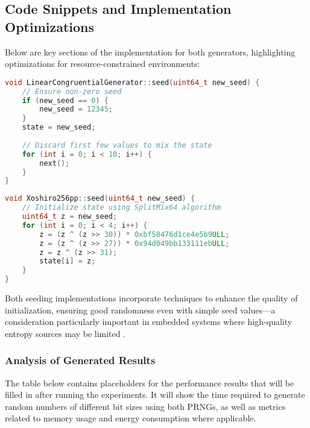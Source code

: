 \subsection{Code Snippets and Implementation Optimizations}

Below are key sections of the implementation for both generators, highlighting optimizations for resource-constrained environments:

\begin{lstlisting}[language=C++, caption=LCG Seeding Implementation]
void LinearCongruentialGenerator::seed(uint64_t new_seed) {
    // Ensure non-zero seed
    if (new_seed == 0) {
        new_seed = 12345;
    }
    state = new_seed;
    
    // Discard first few values to mix the state
    for (int i = 0; i < 10; i++) {
        next();
    }
}
\end{lstlisting}

\begin{lstlisting}[language=C++, caption=Xoshiro256++ Seeding Implementation]
void Xoshiro256pp::seed(uint64_t new_seed) {
    // Initialize state using SplitMix64 algorithm
    uint64_t z = new_seed;
    for (int i = 0; i < 4; i++) {
        z = (z ^ (z >> 30)) * 0xbf58476d1ce4e5b9ULL;
        z = (z ^ (z >> 27)) * 0x94d049bb133111ebULL;
        z = z ^ (z >> 31);
        state[i] = z;
    }
}
\end{lstlisting}

Both seeding implementations incorporate techniques to enhance the quality of initialization, ensuring good randomness even with simple seed values—a consideration particularly important in embedded systems where high-quality entropy sources may be limited \cite{embedded_prng}.

\subsubsection{Analysis of Generated Results}

The table below contains placeholders for the performance results that will be filled in after running the experiments. It will show the time required to generate random numbers of different bit sizes using both PRNGs, as well as metrics related to memory usage and energy consumption where applicable.

